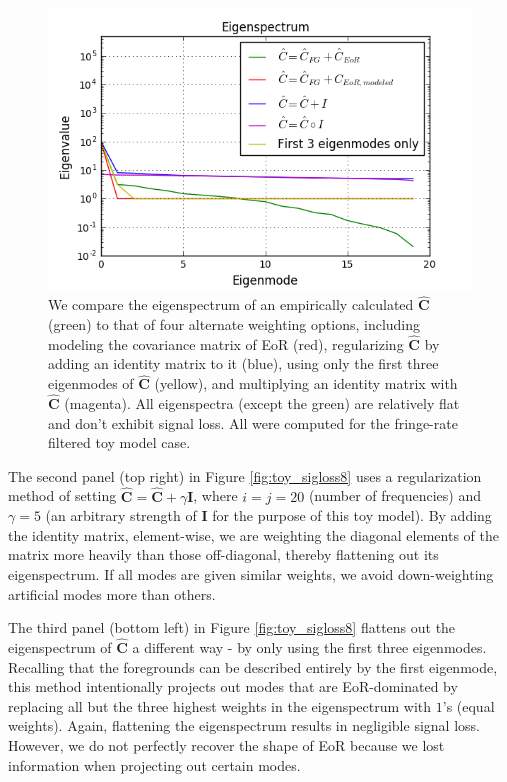 \documentclass[preprint2,numberedappendix,tighten]{aastex6}  %
\begin{document}
\begin{figure}
	\centering
	\includegraphics[trim={0.3cm 0.3cm 0.3cm 0.3cm},clip,width=\columnwidth]{plots/toy_sigloss14.png}
	\caption{We compare the eigenspectrum of an empirically calculated $\hat{\textbf{C}}$ (green) to that of four alternate weighting options, including modeling the covariance matrix of EoR (red), regularizing $\hat{\textbf{C}}$ by adding an identity matrix to it (blue), using only the first three eigenmodes of $\hat{\textbf{C}}$ (yellow), and multiplying an identity matrix with $\hat{\textbf{C}}$ (magenta). All eigenspectra (except the green) are relatively flat and don't exhibit signal loss. All were computed for the fringe-rate filtered toy model case.}
	\label{fig:toy_sigloss14}
\end{figure}

The second panel (top right) in Figure \ref{fig:toy_sigloss8} uses a regularization method of setting $\hat{\textbf{C}} = \hat{\textbf{C}} + \gamma\textbf{I}$, where $i$$=$$j$$=$$20$ (number of frequencies) and $\gamma = 5$ (an arbitrary strength of $\textbf{I}$ for the purpose of this toy model). By adding the identity matrix, element-wise, we are weighting the diagonal elements of the matrix more heavily than those off-diagonal, thereby flattening out its eigenspectrum. If all modes are given similar weights, we avoid down-weighting artificial modes more than others.  

The third panel (bottom left) in Figure \ref{fig:toy_sigloss8} flattens out the eigenspectrum of $\hat{\textbf{C}}$ a different way - by only using the first three eigenmodes. Recalling that the foregrounds can be described entirely by the first eigenmode, this method intentionally projects out modes that are EoR-dominated by replacing all but the three highest weights in the eigenspectrum with $1$'s (equal weights). Again, flattening the eigenspectrum results in negligible signal loss. However, we do not perfectly recover the shape of EoR because we lost information when projecting out certain modes. 
\end{document}
